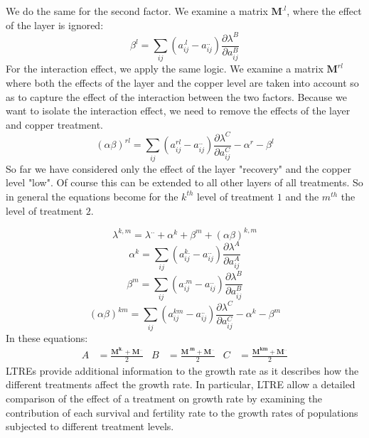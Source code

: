 \documentclass{article}\usepackage[]{graphicx}\usepackage[]{color}
\begin{document}
\begin{mdframed}
We do the same for the second factor. We examine a matrix $\boldsymbol{M}^{.l}$, where the effect of the layer is ignored: 
\begin{equation}\label{d}
\beta^{l}=\sum_{ij}(a^{.l}_{ij}-a^{..}_{ij}) \frac{\partial\lambda^{B}}{\partial a^{B}_{ij}}
\end{equation}
For the interaction effect, we apply the same logic. We examine a matrix $\boldsymbol{M}^{rl}$ where both the effects of the layer and the copper level are taken into account so as to capture the effect of the interaction between the two factors. Because we want to isolate the interaction effect, we need to remove the effects of the layer and copper treatment.
\begin{equation}
(\alpha \beta)^{rl}=\sum_{ij}(a^{rl}_{ij}-a^{..}_{ij}) \frac{\partial\lambda^{C}}{\partial a^{C}_{ij}} -\alpha^{r}-\beta^{l}
\end{equation}
So far we have considered only the effect of the layer "recovery" and the copper level "low". Of course this can be extended to all other layers of all treatments. So in general the equations become for the $k^{th}$ level of treatment $1$ and the $m^{th}$ the level of treatment $2$.

\begin{equation}\label{f}
\lambda^{k,m}=\lambda^{..}+\alpha^{k}+\beta^{m}+(\alpha \beta)^{k,m}
\end{equation}
\begin{equation}\label{e}
\alpha^{k}=\sum_{ij}(a^{k.}_{ij}-a^{..}_{ij}) \frac{\partial\lambda^{A}}{\partial a^{A}_{ij}}
\end{equation}
\begin{equation}
\beta^{m}=\sum_{ij}(a^{.m}_{ij}-a^{..}_{ij}) \frac{\partial\lambda^{B}}{\partial a^{B}_{ij}}
\end{equation}
\begin{equation}
(\alpha \beta)^{km}=\sum_{ij}(a^{km}_{ij}-a^{..}_{ij}) \frac{\partial\lambda^{C}}{\partial a^{C}_{ij}} -\alpha^{k}-\beta^{m}
\end{equation}
In these equations:
\begin{align}
A &= \frac{\boldsymbol{M^{k.}} + \boldsymbol{M^{..}}}{2} & B &= \frac{\boldsymbol{M^{.m}} + \boldsymbol{M^{..}}}{2} & C &= \frac{\boldsymbol{M^{km}} + \boldsymbol{M^{..}}}{2}
\end{align}
LTREs provide additional information to the growth rate as it describes how the different treatments affect the growth rate. In particular, LTRE allow a detailed comparison of the effect of a treatment on growth rate by examining the contribution of each survival and fertility rate to the growth rates of populations subjected to different treatment levels.
\end{mdframed}
\end{document}
